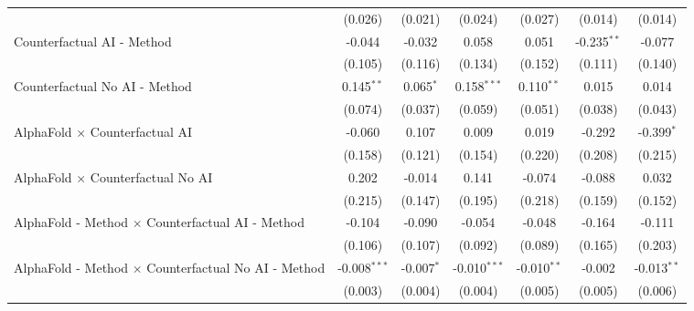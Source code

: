 \begin{tabular}{lcccccc}
                                                              & (0.026)        & (0.021)       & (0.024)        & (0.027)       & (0.014)       & (0.014)\\   
   Counterfactual AI - Method                                 & -0.044         & -0.032        & 0.058          & 0.051         & -0.235$^{**}$ & -0.077\\   
                                                              & (0.105)        & (0.116)       & (0.134)        & (0.152)       & (0.111)       & (0.140)\\   
   Counterfactual No AI - Method                              & 0.145$^{**}$   & 0.065$^{*}$   & 0.158$^{***}$  & 0.110$^{**}$  & 0.015         & 0.014\\   
                                                              & (0.074)        & (0.037)       & (0.059)        & (0.051)       & (0.038)       & (0.043)\\   
   AlphaFold $\times$ Counterfactual AI                       & -0.060         & 0.107         & 0.009          & 0.019         & -0.292        & -0.399$^{*}$\\   
                                                              & (0.158)        & (0.121)       & (0.154)        & (0.220)       & (0.208)       & (0.215)\\   
   AlphaFold $\times$ Counterfactual No AI                    & 0.202          & -0.014        & 0.141          & -0.074        & -0.088        & 0.032\\   
                                                              & (0.215)        & (0.147)       & (0.195)        & (0.218)       & (0.159)       & (0.152)\\   
   AlphaFold - Method $\times$ Counterfactual AI - Method     & -0.104         & -0.090        & -0.054         & -0.048        & -0.164        & -0.111\\   
                                                              & (0.106)        & (0.107)       & (0.092)        & (0.089)       & (0.165)       & (0.203)\\   
   AlphaFold - Method $\times$ Counterfactual No AI - Method  & -0.008$^{***}$ & -0.007$^{*}$  & -0.010$^{***}$ & -0.010$^{**}$ & -0.002        & -0.013$^{**}$\\   
                                                              & (0.003)        & (0.004)       & (0.004)        & (0.005)       & (0.005)       & (0.006)\\   
   \midrule

\end{tabular}
